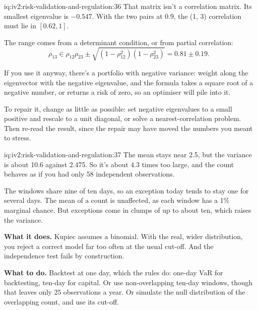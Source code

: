 \begin{solution}{iq:iv2:risk-validation-and-regulation:36}
That matrix isn't a correlation matrix. Its smallest eigenvalue is $-0.547$. With the two pairs at 0.9, the (1, 3) correlation must lie in $[0.62, 1]$.

The range comes from a determinant condition, or from partial correlation:
\[
\rho_{13} \in \rho_{12}\rho_{23} \pm \sqrt{(1 - \rho_{12}^2)(1 - \rho_{23}^2)} = 0.81 \pm 0.19.
\]

If you use it anyway, there's a portfolio with negative variance: weight along the eigenvector with the negative eigenvalue, and the formula takes a square root of a negative number, or returns a risk of zero, so an optimiser will pile into it.

To repair it, change as little as possible: set negative eigenvalues to a small positive and rescale to a unit diagonal, or solve a nearest-correlation problem. Then re-read the result, since the repair may have moved the numbers you meant to stress.

\end{solution}

\begin{solution}{iq:iv2:risk-validation-and-regulation:37}
The mean stays near 2.5, but the variance is about 10.6 against 2.475. So it's about 4.3 times too large, and the count behaves as if you had only 58 independent observations.

The windows share nine of ten days, so an exception today tends to stay one for several days. The mean of a count is unaffected, as each window has a 1\% marginal chance. But exceptions come in clumps of up to about ten, which raises the variance.

\textbf{What it does.} Kupiec assumes a binomial. With the real, wider distribution, you reject a correct model far too often at the usual cut-off. And the independence test fails by construction.

\textbf{What to do.} Backtest at one day, which the rules do: one-day VaR for backtesting, ten-day for capital. Or use non-overlapping ten-day windows, though that leaves only 25 observations a year. Or simulate the null distribution of the overlapping count, and use its cut-off.

\end{solution}


